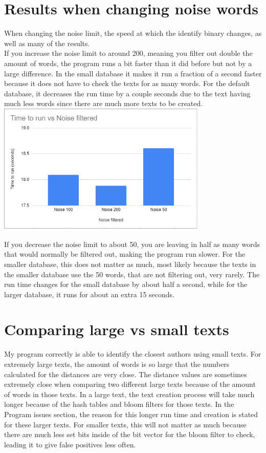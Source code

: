 \documentclass[11pt]{article}
\begin{document}
\section{Results when changing noise words}\label{ss:noise}
When changing the noise limit, the speed at which the identify binary changes, as well as many of the results.\\
If you increase the noise limit to around 200, meaning you filter out double the amount of words, the program runs a bit faster than it did before but not by a large difference. In the small database it makes it run a fraction of a second faster because it does not have to check the texts for as many words. For the default database, it decreases the run time by a couple seconds due to the text having much less words since there are much more texts to be created. \\

\includegraphics[width = 0.75\textwidth]{Graphs/Noise.PNG}

If you decrease the noise limit to about 50, you are leaving in half as many words that would normally be filtered out, making the program run slower. For the smaller database, this does not matter as much, most likely because the texts in the smaller database use the 50 words, that are not filtering out, very rarely. The run time changes for the small database by about half a second, while for the larger database, it runs for about an extra 15 seconds. 

\section{Comparing large vs small texts}\label{ss:size}
My program correctly is able to identify the closest authors using small texts. For extremely large texts, the amount of words is so large that the numbers calculated for the distances are very close. The distance values are sometimes extremely close when comparing two different large texts because of the amount of words in those texts. In a large text, the text creation process will take much longer because of the hash tables and bloom filters for those texts. In the Program issues section, the reason for this longer run time and creation is stated for these larger texts. For smaller texts, this will not matter as much because there are much less set bits inside of the bit vector for the bloom filter to check, leading it to give false positives less often. 
\end{document}
